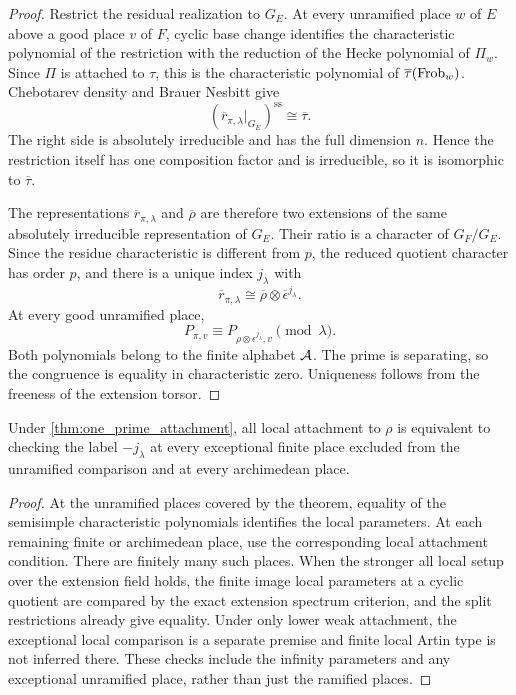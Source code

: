 \begin{proof}
Restrict the residual realization to \(G_E\). At every unramified place \(w\) of \(E\) above a good place \(v\) of \(F\), cyclic base change identifies the characteristic polynomial of the restriction with the reduction of the Hecke polynomial of \(\Pi_w\). Since \(\Pi\) is attached to \(\tau\), this is the characteristic polynomial of \(\overline\tau(\operatorname{Frob}_w)\). Chebotarev density and Brauer Nesbitt give
\[
\left(
\overline r_{\pi,\lambda}|_{G_E}
\right)^{\mathrm{ss}}
\cong
\overline\tau.
\]
The right side is absolutely irreducible and has the full dimension \(n\). Hence the restriction itself has one composition factor and is irreducible, so it is isomorphic to \(\overline\tau\).

The representations \(\overline r_{\pi,\lambda}\) and \(\overline\rho\) are therefore two extensions of the same absolutely irreducible representation of \(G_E\). Their ratio is a character of \(G_F/G_E\). Since the residue characteristic is different from \(p\), the reduced quotient character has order \(p\), and there is a unique index \(j_{\lambda}\) with
\[
\overline r_{\pi,\lambda}
\cong
\overline\rho\otimes\overline\epsilon^{j_{\lambda}}.
\]
At every good unramified place,
\[
P_{\pi,v}
\equiv
P_{\rho\otimes\epsilon^{j_{\lambda}},v}
\pmod\lambda.
\]
Both polynomials belong to the finite alphabet \(\mathcal A\). The prime is separating, so the congruence is equality in characteristic zero. Uniqueness follows from the freeness of the extension torsor.
\end{proof}

\begin{corollary}\label{cor:finitely_many_local_checks}
Under \cref{thm:one_prime_attachment}, all local attachment to \(\rho\) is equivalent to checking the label \(-j_\lambda\) at every exceptional finite place excluded from the unramified comparison and at every archimedean place.
\end{corollary}

\begin{proof}
At the unramified places covered by the theorem, equality of the semisimple characteristic polynomials identifies the local parameters. At each remaining finite or archimedean place, use the corresponding local attachment condition. There are finitely many such places. When the stronger all local setup over the extension field holds, the finite image local parameters at a cyclic quotient are compared by the exact extension spectrum criterion, and the split restrictions already give equality. Under only lower weak attachment, the exceptional local comparison is a separate premise and finite local Artin type is not inferred there. These checks include the infinity parameters and any exceptional unramified place, rather than just the ramified places.
\end{proof}

